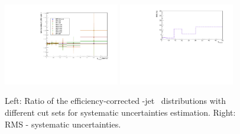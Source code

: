 \begin{figure}[bth]
\begin{center}
\includegraphics[width=0.45\textwidth]{pPbcuts_2sig/cutSys2/cutSys_spectraRatio_D3}
\includegraphics[width=0.45\textwidth]{pPbcuts_2sig/cutSys2/cutSys_rms_D3}
\caption{Left: Ratio of the efficiency-corrected \Dzero-jet \pt\ distributions with different cut sets for systematic uncertainties estimation. Right: RMS - systematic uncertainties.} 
\label{fig:JetPtSys_Dzero}
\end{center}
\end{figure}

%

